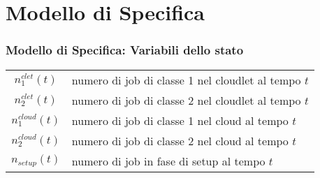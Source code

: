 \section{Modello di Specifica}
\begin{frame}
\frametitle{Modello di Specifica: Variabili dello stato}
\begin{table}[!h]
\begin{tabular}{c|l}
{$n_1^{clet}(t)$}  & numero di job di classe 1 nel cloudlet al tempo $t$\\
{$n_2^{clet}(t)$}  & numero di job di classe 2 nel cloudlet al tempo $t$\\
{$n_1^{cloud}(t)$} & numero di job di classe 1 nel cloud al tempo $t$\\
{$n_2^{cloud}(t)$} & numero di job di classe 2 nel cloud al tempo $t$\\
{$n_{setup}(t)$}   & numero di job in fase di setup al tempo $t$\\
\end{tabular}
\centering
\label{state}
\end{table}
\end{frame}
